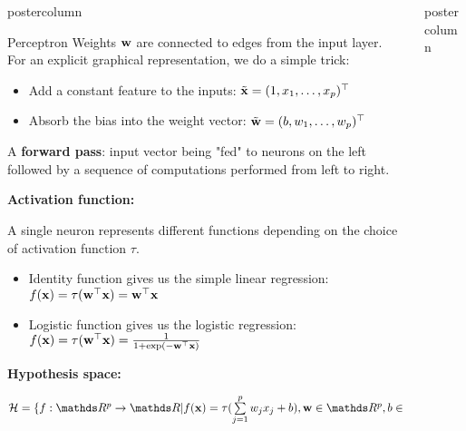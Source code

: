 \documentclass{beamer}
\newlength{\columnheight} %
\begin{document}
\begin{frame}[fragile]{}
\begin{columns}
\begin{column}{.31\textwidth}
\begin{beamercolorbox}[center]{postercolumn}
\begin{minipage}{.98\textwidth}
{\begin{myblock}{Perceptron}
Weights $\mathbf{w}$ are connected to edges from the input layer.\\
For an explicit graphical representation, we do a simple trick:
\begin{itemize}[$\bullet$] 
  \setlength{\itemindent}{+.3in}
  \item Add a constant feature to the inputs: $\tilde{\mathbf{x}} = (1,x_1, \ldots, x_p)^\top$
  \item Absorb the bias into the weight vector: $\tilde{\mathbf{w}} = (b,w_1, \ldots, w_p)^\top $
\end{itemize}

A \textbf{forward pass}: input vector being "fed" to neurons on the left followed by a sequence of computations performed from left to right. 

\begin{codebox} 
  \textbf{Activation function:}
  \end{codebox}
A single neuron represents different functions depending on the choice of activation function $\tau$.

\begin{itemize}[$\bullet$] 
  \setlength{\itemindent}{+.3in}
  \item Identity function gives us the simple linear regression: $f(\mathbf{x})=\tau(\mathbf{w}^\top\mathbf{x})=\mathbf{w}^\top\mathbf{x}$
  \item Logistic function gives us the logistic regression: $f(\mathbf{x})=\tau(\mathbf{w}^\top\mathbf{x})=\frac{1}{1+\text{exp}(-\mathbf{w}^\top\mathbf{x})}$
\end{itemize}

\begin{codebox} 
  \textbf{Hypothesis space:}
  \end{codebox}
  $\Hspace = \{f: \R^p \rightarrow \R | \fx = \tau(\sumjp w_jx_j+b), \wtw \in \R^p, b\in \R\}$
  

\end{myblock}\vfill
				}
			\end{minipage}
		\end{beamercolorbox}
	\end{column}
	

\begin{column}{.31\textwidth}
\begin{beamercolorbox}[center]{postercolumn}
\begin{minipage}{.98\textwidth}
\parbox[t][\columnheight]{\textwidth}{

\begin{myblock}{ }
  

\end{myblock}}
\end{minipage}
\end{beamercolorbox}
\end{column}
\end{columns}
\end{frame}
\end{document}
